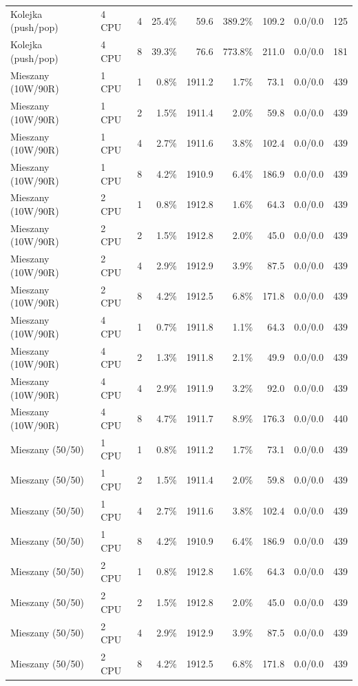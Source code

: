 \begin{table}[ht]
{\begin{tabular}{llcrrrrcc}
Kolejka (push/pop) & 4 CPU & 4 & 25.4\% & 59.6 & 389.2\% & 109.2 & 0.0/0.0 & 125 \\
Kolejka (push/pop) & 4 CPU & 8 & 39.3\% & 76.6 & 773.8\% & 211.0 & 0.0/0.0 & 181 \\
Mieszany (10W/90R) & 1 CPU & 1 & 0.8\% & 1911.2 & 1.7\% & 73.1 & 0.0/0.0 & 439 \\
Mieszany (10W/90R) & 1 CPU & 2 & 1.5\% & 1911.4 & 2.0\% & 59.8 & 0.0/0.0 & 439 \\
Mieszany (10W/90R) & 1 CPU & 4 & 2.7\% & 1911.6 & 3.8\% & 102.4 & 0.0/0.0 & 439 \\
Mieszany (10W/90R) & 1 CPU & 8 & 4.2\% & 1910.9 & 6.4\% & 186.9 & 0.0/0.0 & 439 \\
Mieszany (10W/90R) & 2 CPU & 1 & 0.8\% & 1912.8 & 1.6\% & 64.3 & 0.0/0.0 & 439 \\
Mieszany (10W/90R) & 2 CPU & 2 & 1.5\% & 1912.8 & 2.0\% & 45.0 & 0.0/0.0 & 439 \\
Mieszany (10W/90R) & 2 CPU & 4 & 2.9\% & 1912.9 & 3.9\% & 87.5 & 0.0/0.0 & 439 \\
Mieszany (10W/90R) & 2 CPU & 8 & 4.2\% & 1912.5 & 6.8\% & 171.8 & 0.0/0.0 & 439 \\
Mieszany (10W/90R) & 4 CPU & 1 & 0.7\% & 1911.8 & 1.1\% & 64.3 & 0.0/0.0 & 439 \\
Mieszany (10W/90R) & 4 CPU & 2 & 1.3\% & 1911.8 & 2.1\% & 49.9 & 0.0/0.0 & 439 \\
Mieszany (10W/90R) & 4 CPU & 4 & 2.9\% & 1911.9 & 3.2\% & 92.0 & 0.0/0.0 & 439 \\
Mieszany (10W/90R) & 4 CPU & 8 & 4.7\% & 1911.7 & 8.9\% & 176.3 & 0.0/0.0 & 440 \\
Mieszany (50/50) & 1 CPU & 1 & 0.8\% & 1911.2 & 1.7\% & 73.1 & 0.0/0.0 & 439 \\
Mieszany (50/50) & 1 CPU & 2 & 1.5\% & 1911.4 & 2.0\% & 59.8 & 0.0/0.0 & 439 \\
Mieszany (50/50) & 1 CPU & 4 & 2.7\% & 1911.6 & 3.8\% & 102.4 & 0.0/0.0 & 439 \\
Mieszany (50/50) & 1 CPU & 8 & 4.2\% & 1910.9 & 6.4\% & 186.9 & 0.0/0.0 & 439 \\
Mieszany (50/50) & 2 CPU & 1 & 0.8\% & 1912.8 & 1.6\% & 64.3 & 0.0/0.0 & 439 \\
Mieszany (50/50) & 2 CPU & 2 & 1.5\% & 1912.8 & 2.0\% & 45.0 & 0.0/0.0 & 439 \\
Mieszany (50/50) & 2 CPU & 4 & 2.9\% & 1912.9 & 3.9\% & 87.5 & 0.0/0.0 & 439 \\
Mieszany (50/50) & 2 CPU & 8 & 4.2\% & 1912.5 & 6.8\% & 171.8 & 0.0/0.0 & 439 \\

\end{tabular}}
\end{table}
